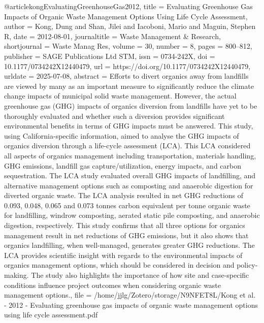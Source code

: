 {{{{@article{kongEvaluatingGreenhouseGas2012,
  title = {Evaluating Greenhouse Gas Impacts of Organic Waste Management Options Using Life Cycle Assessment},
  author = {Kong, Dung and Shan, Jilei and Iacoboni, Mario and Maguin, Stephen R},
  date = {2012-08-01},
  journaltitle = {Waste Management \& Research},
  shortjournal = {Waste Manag Res},
  volume = {30},
  number = {8},
  pages = {800--812},
  publisher = {SAGE Publications Ltd STM},
  issn = {0734-242X},
  doi = {10.1177/0734242X12440479},
  url = {https://doi.org/10.1177/0734242X12440479},
  urldate = {2025-07-08},
  abstract = {Efforts to divert organics away from landfills are viewed by many as an important measure to significantly reduce the climate change impacts of municipal solid waste management. However, the actual greenhouse gas (GHG) impacts of organics diversion from landfills have yet to be thoroughly evaluated and whether such a diversion provides significant environmental benefits in terms of GHG impacts must be answered. This study, using California-specific information, aimed to analyse the GHG impacts of organics diversion through a life-cycle assessment (LCA). This LCA considered all aspects of organics management including transportation, materials handling, GHG emissions, landfill gas capture/utilization, energy impacts, and carbon sequestration. The LCA study evaluated overall GHG impacts of landfilling, and alternative management options such as composting and anaerobic digestion for diverted organic waste. The LCA analysis resulted in net GHG reductions of 0.093, 0.048, 0.065 and 0.073 tonnes carbon equivalent per tonne organic waste for landfilling, windrow composting, aerated static pile composting, and anaerobic digestion, respectively. This study confirms that all three options for organics management result in net reductions of GHG emissions, but it also shows that organics landfilling, when well-managed, generates greater GHG reductions. The LCA provides scientific insight with regards to the environmental impacts of organics management options, which should be considered in decision and policy-making. The study also highlights the importance of how site and case-specific conditions influence project outcomes when considering organic waste management options.},
  file = {/home/jjlg/Zotero/storage/N9NFET8L/Kong et al. - 2012 - Evaluating greenhouse gas impacts of organic waste management options using life cycle assessment.pdf}
}

}}}}
